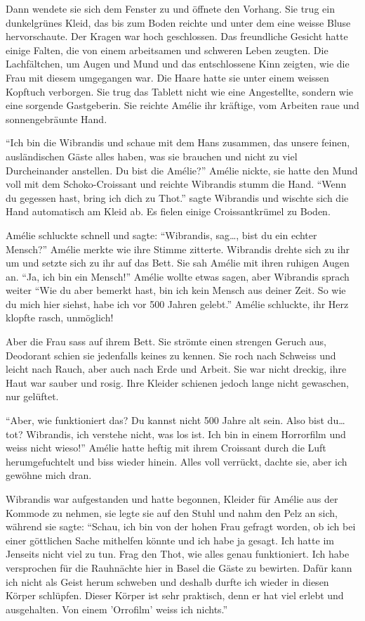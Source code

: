 \documentclass[11pt,titlepage,a5paper]{book}
\begin{document}
 Dann wendete sie sich dem Fenster zu und öffnete den Vorhang. Sie trug ein dunkelgrünes Kleid, das bis zum Boden reichte und unter dem eine weisse Bluse hervorschaute. Der Kragen war hoch geschlossen. Das freundliche Gesicht hatte einige Falten, die von einem arbeitsamen und schweren Leben zeugten. Die Lachfältchen, um Augen und Mund und das entschlossene Kinn zeigten, wie die Frau mit diesem umgegangen war. Die Haare hatte sie unter einem weissen Kopftuch verborgen. Sie trug das Tablett nicht wie eine Angestellte, sondern wie eine sorgende Gastgeberin. Sie reichte Amélie ihr kräftige, vom Arbeiten raue und sonnengebräunte Hand.
 
"`Ich bin die Wibrandis und schaue mit dem Hans zusammen, das unsere feinen,  ausländischen Gäste alles haben, was sie brauchen und nicht zu viel Durcheinander anstellen. Du bist die Amélie?"' Amélie nickte, sie hatte den Mund voll mit dem Schoko-Croissant und reichte Wibrandis stumm die Hand. "`Wenn du gegessen hast, bring ich dich zu Thot."' sagte Wibrandis und wischte sich die Hand automatisch am Kleid ab. Es fielen einige Croissantkrümel zu Boden.

 Amélie schluckte schnell und sagte: "`Wibrandis, sag\dots, bist du ein echter Mensch?"' Amélie merkte wie ihre Stimme zitterte. Wibrandis drehte sich zu ihr um und setzte sich zu ihr auf das Bett. Sie sah Amélie mit ihren ruhigen Augen an. "`Ja, ich bin ein Mensch!"' Amélie wollte etwas sagen, aber Wibrandis sprach weiter "`Wie du aber bemerkt hast, bin ich kein Mensch aus deiner Zeit. So wie du mich hier siehst, habe ich vor 500 Jahren gelebt."' Amélie schluckte, ihr Herz klopfte rasch, unmöglich!
 
Aber die Frau sass auf ihrem Bett. Sie strömte einen strengen Geruch aus, Deodorant schien sie jedenfalls keines zu kennen. Sie roch nach Schweiss und leicht nach Rauch, aber auch nach Erde und Arbeit. Sie war nicht dreckig, ihre Haut war sauber und rosig. Ihre Kleider schienen jedoch lange nicht gewaschen, nur gelüftet. 

"`Aber, wie funktioniert das? Du kannst nicht 500 Jahre alt sein. Also bist du\dots tot? Wibrandis, ich verstehe nicht, was los ist. Ich bin in einem Horrorfilm und weiss nicht wieso!"' Amélie hatte heftig mit ihrem Croissant durch die Luft herumgefuchtelt und biss wieder hinein. Alles voll verrückt, dachte sie, aber ich gewöhne mich dran.  

Wibrandis war aufgestanden und hatte begonnen, Kleider für Amélie aus der Kommode zu nehmen, sie legte sie auf den Stuhl und nahm den Pelz an sich, während sie sagte: "`Schau, ich bin von der hohen Frau gefragt worden, ob ich bei einer göttlichen Sache mithelfen könnte und ich habe ja gesagt. Ich hatte im Jenseits nicht viel zu tun. Frag den Thot, wie alles genau funktioniert. Ich habe versprochen für die Rauhnächte hier in Basel die Gäste zu bewirten. Dafür kann ich nicht als Geist herum schweben und deshalb durfte ich wieder in diesen Körper schlüpfen. Dieser Körper ist sehr praktisch, denn er hat viel erlebt und ausgehalten. Von einem 'Orrofilm' weiss ich nichts."'
\end{document}
